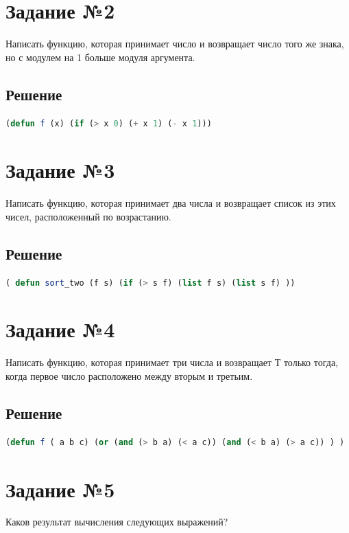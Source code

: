 \documentclass[12pt]{report}
\begin{document}
\section*{Задание №2}
Написать функцию, которая принимает число и возвращает число того же знака, но с модулем на 1 больше модуля аргумента.

\subsection*{Решение}

\begin{lstlisting}[label=second,caption=Решение задания №2, language=lisp]
(defun f (x) (if (> x 0) (+ x 1) (- x 1)))
\end{lstlisting}

\section*{Задание №3}
Написать функцию, которая принимает два числа и возвращает список из этих чисел, расположенный по возрастанию.

\subsection*{Решение}
\begin{lstlisting}[label=third,caption=Решение задания №3, language=lisp]
( defun sort_two (f s) (if (> s f) (list f s) (list s f) ))
\end{lstlisting}

\section*{Задание №4}
Написать функцию, которая принимает три числа и возвращает Т только тогда, когда первое число расположено между вторым и третьим.

\subsection*{Решение}
\begin{lstlisting}[label=4,caption=Решение задания №4, language=lisp]
(defun f ( a b c) (or (and (> b a) (< a c)) (and (< b a) (> a c)) ) )
\end{lstlisting}

\section*{Задание №5}
Каков результат вычисления следующих выражений?
\end{document}
